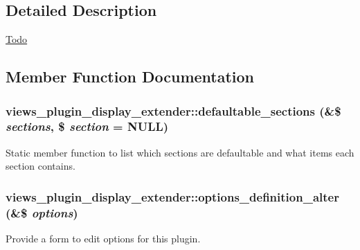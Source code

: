 \subsection{Detailed Description}
\begin{Desc}
\item[\hyperlink{todo__todo000084}{Todo}]\end{Desc}


\subsection{Member Function Documentation}
\hypertarget{classviews__plugin__display__extender_ae7dfa23cf88eee9abdbdf6e6ba622f61}{
\subsubsection[{defaultable\_\-sections}]{\setlength{\rightskip}{0pt plus 5cm}views\_\-plugin\_\-display\_\-extender::defaultable\_\-sections (\&\$ {\em sections}, \/  \$ {\em section} = {\ttfamily NULL})}}
\label{classviews__plugin__display__extender_ae7dfa23cf88eee9abdbdf6e6ba622f61}
Static member function to list which sections are defaultable and what items each section contains. \hypertarget{classviews__plugin__display__extender_a684077b715aa9ddce09d223544b7263c}{
\subsubsection[{options\_\-definition\_\-alter}]{\setlength{\rightskip}{0pt plus 5cm}views\_\-plugin\_\-display\_\-extender::options\_\-definition\_\-alter (\&\$ {\em options})}}
\label{classviews__plugin__display__extender_a684077b715aa9ddce09d223544b7263c}
Provide a form to edit options for this plugin. 


